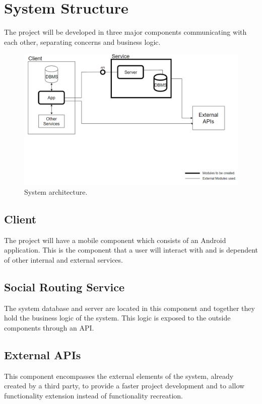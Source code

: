 \documentclass{article}
\begin{document}
    \section{System Structure}
        The project will be developed in three major components communicating with each other, separating concerns and business logic.
        
        \begin{figure}[h]            
            \includegraphics[width=\textwidth]{images/project-structure/system-structure.PNG}
            \caption{System architecture.}
        \end{figure}  

        \subsection{Client}  
            The project will have a mobile component which consists of an Android application. 
            This is the component that a user will interact with and is dependent of other internal and external services.
        \subsection{Social Routing Service}
            The system database and server are located in this component and together they hold the business logic of the system.
            This logic is exposed to the outside components through an API.
        \subsection{External APIs}
            This component encompasses the external elements of the system, already created by a third party, to provide a faster project development
            and to allow functionality extension instead of functionality recreation. 
    
\end{document}
